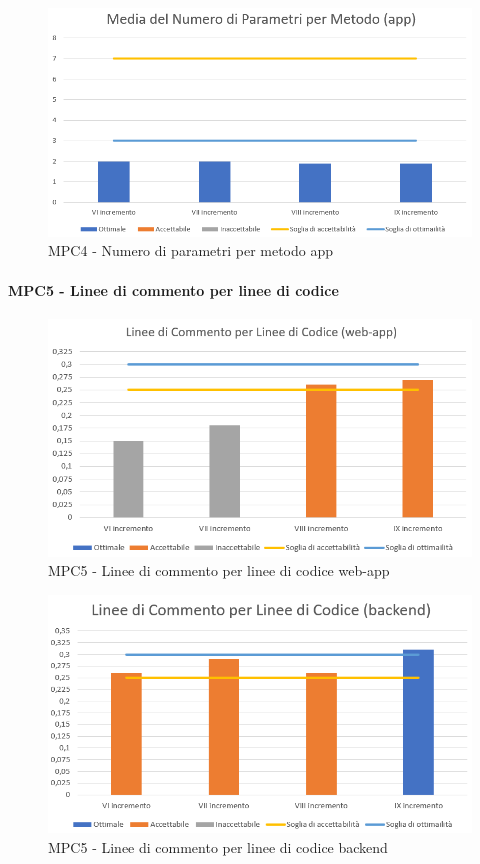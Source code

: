   \begin{figure}[h!]
    \centering
      \includegraphics[scale=1]{Immagini/MediaNumPar APPA.PNG}
    \caption{MPC4 - Numero di parametri per metodo app}
  \end{figure}


  \clearpage
  \paragraph{MPC5 - Linee di commento per linee di codice}
  \begin{figure}[h!]
    \centering
      \includegraphics[scale=1]{Immagini/lineeCommLineeCod WAA.PNG}
    \caption{MPC5 - Linee di commento per linee di codice web-app}
  \end{figure}

  \begin{figure}[h!]
    \centering
      \includegraphics[scale=1]{Immagini/lineeCommLineeCod BEA.PNG}
    \caption{MPC5 - Linee di commento per linee di codice backend}
  \end{figure}

